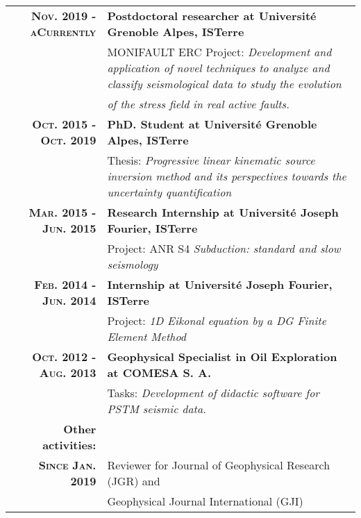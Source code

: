 \documentclass[a4paper,10.5pt]{article} %
\begin{document}
\begin{tabular}{rp{11cm}}

{\bf \textsc{Nov. 2019 - aCurrently }} & {\bf Postdoctoral researcher at Universit\'e Grenoble Alpes, ISTerre} \\
& MONIFAULT ERC Project: \emph{Development and application of novel techniques to analyze and classify seismological data to study the evolution} \\
& \emph{of the stress field in real active faults.}  \\[0.6em] 

{\bf \textsc{Oct. 2015 - Oct. 2019}} & {\bf PhD. Student at Universit\'e Grenoble Alpes, ISTerre} \\
& Thesis: \emph{Progressive linear kinematic source inversion
method and its perspectives towards the
uncertainty quantification} \\[0.6em] 

{\bf \textsc{Mar. 2015 - Jun. 2015}} & {\bf Research Internship at Universit\'e Joseph Fourier, ISTerre} \\
& Project:  ANR S4 \emph{Subduction: standard and slow seismology}\\[0.6em]

{\bf \textsc{Feb. 2014 - Jun. 2014}} & {\bf Internship at Universit\'e Joseph Fourier, ISTerre} \\
& Project: \emph{1D Eikonal equation by a DG Finite Element Method}\\[0.6em]

{\bf \textsc{Oct. 2012 - Aug. 2013}} & {\bf Geophysical Specialist in Oil Exploration at \textsc{COMESA S. A.}} \\
& Tasks: \emph{Development of didactic software for PSTM seismic data.}\\[0.6em]
{\bf Other activities:}\\[0.6em]
{\bf \textsc{Since Jan.} 2019} & Reviewer for Journal of Geophysical Research (JGR) and \\
			       & Geophysical Journal International (GJI)\\[0.6em]
\end{tabular}
\end{document}
